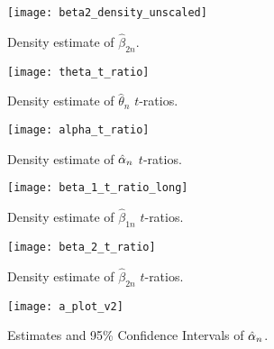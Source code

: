 \begin{figure}[hb]
  \centering
  \caption{Density estimate of $\hat{\beta}_{2n}$.}
  \texttt{[image: beta2\_density\_unscaled]}
\end{figure}

\begin{figure}[hb]
  \centering
  \caption{Density estimate of $\hat{\theta}_n$ $t$-ratios.}
  \texttt{[image: theta\_t\_ratio]}
\end{figure}

\begin{figure}[hb]
  \centering
  \caption{Density estimate of $\hat{\alpha}_n$ $t$-ratios.}
  \texttt{[image: alpha\_t\_ratio]}
\end{figure}

\begin{figure}[hb]
  \centering
  \caption{Density estimate of $\hat{\beta}_{1n}$ $t$-ratios.}
  \texttt{[image: beta\_1\_t\_ratio\_long]}
\end{figure}

\begin{figure}[hb]
\centering
  \caption{Density estimate of $\hat{\beta}_{2n}$ $t$-ratios.}
  \texttt{[image: beta\_2\_t\_ratio]}
\end{figure}

\begin{figure}[hb]
  \centering
  \caption{Estimates and 95\% Confidence Intervals of $\hat{\alpha}_{n}$.}
  \texttt{[image: a\_plot\_v2]} \\
\end{figure}

\begin{table}[!ht]
\selectfont \caption{Confidence Intervals (95\% confidence) of $\hat{\alpha}_{n}$.}
\label{alpha_est} 
\end{table}



